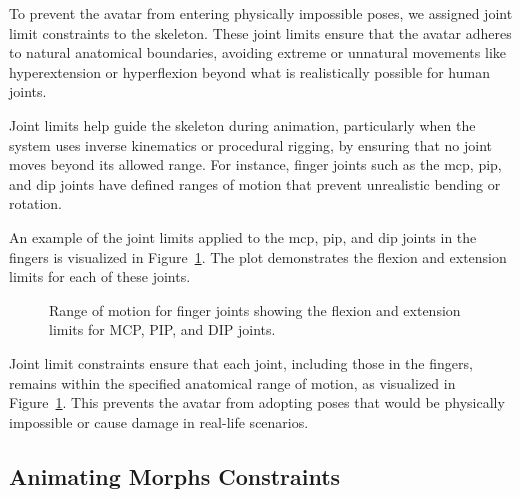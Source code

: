 \documentclass[../../main.tex]{subfiles}
\begin{document}
To prevent the avatar from entering physically impossible poses, we assigned joint limit constraints to the skeleton. These joint limits ensure that the avatar adheres to natural anatomical boundaries, avoiding extreme or unnatural movements like hyperextension or hyperflexion beyond what is realistically possible for human joints.

Joint limits help guide the skeleton during animation, particularly when the system uses inverse kinematics or procedural rigging, by ensuring that no joint moves beyond its allowed range. For instance, finger joints such as the \gls{mcp}, \gls{pip}, and \gls{dip} joints have defined ranges of motion that prevent unrealistic bending or rotation.

An example of the joint limits applied to the \gls{mcp}, \gls{pip}, and \gls{dip} joints in the fingers is visualized in Figure~\ref{fig:joint_limits_finger}. The plot demonstrates the flexion and extension limits for each of these joints.

\begin{figure}[h!]
    \centering
    \caption{Range of motion for finger joints showing the flexion and extension limits for MCP, PIP, and DIP joints.}
    \label{fig:joint_limits_finger}
\end{figure}

Joint limit constraints ensure that each joint, including those in the fingers, remains within the specified anatomical range of motion, as visualized in Figure~\ref{fig:joint_limits_finger}. This prevents the avatar from adopting poses that would be physically impossible or cause damage in real-life scenarios.

\subsection{Animating Morphs Constraints}
\label{ch:avatar_creation_pose_synthesis:proc_rig_signing_avatars:morph_constraints}
\end{document}
